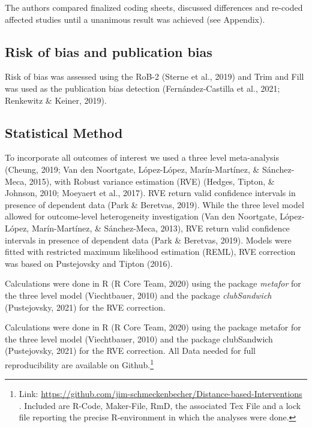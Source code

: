 \documentclass[
  english,
  man]{apa6}
\begin{document}
The authors compared finalized coding sheets, discussed differences and re-coded affected studies until a unanimous result was achieved (see Appendix).

\hypertarget{risk-of-bias-and-publication-bias}{%
\subsection{Risk of bias and publication bias}\label{risk-of-bias-and-publication-bias}}

Risk of bias was assessed using the RoB-2 (Sterne et al., 2019) and Trim and Fill was used as the publication bias detection (Fernández-Castilla et al., 2021; Renkewitz \& Keiner, 2019).

\hypertarget{statistical-method}{%
\subsection{Statistical Method}\label{statistical-method}}

To incorporate all outcomes of interest we used a three level meta-analysis (Cheung, 2019; Van den Noortgate, López-López, Marín-Martínez, \& Sánchez-Meca, 2015), with Robust variance estimation (RVE) (Hedges, Tipton, \& Johnson, 2010; Moeyaert et al., 2017). RVE return valid confidence intervals in presence of dependent data (Park \& Beretvas, 2019). While the three level model allowed for outcome-level heterogeneity investigation (Van den Noortgate, López-López, Marín-Martínez, \& Sánchez-Meca, 2013), RVE return valid confidence intervals in presence of dependent data (Park \& Beretvas, 2019). Models were fitted with restricted maximum likelihood estimation (REML), RVE correction was based on Pustejovsky and Tipton (2016).

Calculations were done in R (R Core Team, 2020) using the package \emph{metafor} for the three level model (Viechtbauer, 2010) and the package \emph{clubSandwich} (Pustejovsky, 2021) for the RVE correction.

Calculations were done in R (R Core Team, 2020) using the package metafor for the three level model (Viechtbauer, 2010) and the package clubSandwich (Pustejovsky, 2021) for the RVE correction. All Data needed for full reproducibility are available on Github.\footnote{Link: \url{https://github.com/jim-schmeckenbecher/Distance-based-Interventions} . Included are R-Code, Maker-File, RmD, the associated Tex File and a lock file reporting the precise R-environment in which the analyses were done.}
\end{document}
